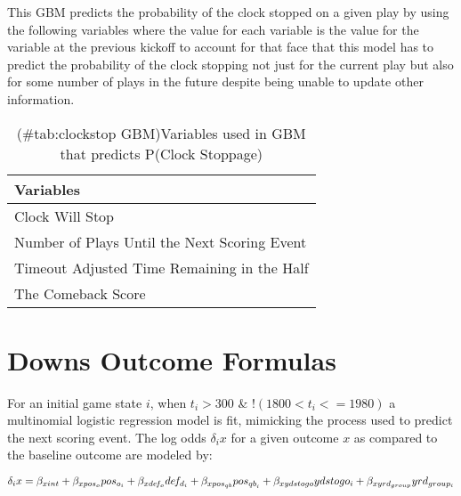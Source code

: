 \documentclass[12pt,twoside]{dukestatscithesis}
\begin{document}
This GBM predicts the probability of the clock stopped on a given play by using the following variables where the value for each variable is the value for the variable at the previous kickoff to account for that face that this model has to predict the probability of the clock stopping not just for the current play but also for some number of plays in the future despite being unable to update other information.
\begin{longtable}[t]{l}
\caption{(\#tab:clockstop GBM)Variables used in GBM that predicts P(Clock Stoppage)}\\
\toprule
Variables\\
\midrule
Clock Will Stop\\
Number of Plays Until the Next Scoring Event\\
Timeout Adjusted Time Remaining in the Half\\
The Comeback Score\\
\bottomrule
\end{longtable}
\hypertarget{downs-outcome-formulas}{%
\section{Downs Outcome Formulas}\label{downs-outcome-formulas}}

For an initial game state \(i\), when \(t_i > 300\) \& !\((1800 < t_i <= 1980)\) a multinomial logistic regression model is fit, mimicking the process used to predict the next scoring event. The log odds \(\delta_ix\) for a given outcome \(x\) as compared to the baseline outcome are modeled by:

\(\delta_ix = \beta_{xint} +\beta_{xpos_{o}}pos_{o_i} + \beta_{xde\hspace{-0.1em}f_{o}}de\hspace{-0.1em}f_{d_i} +\beta_{xpos_{{qb}}}pos_{{qb}_i} + \beta_{xydstogo}ydstogo_i + \beta_{xyrd_{group}}yrd_{group_{i}}\)
\end{document}
